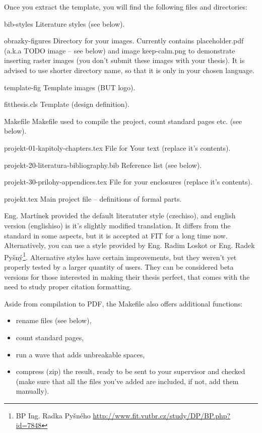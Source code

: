 Once you extract the template, you will find the following files and directories:
\begin{DESCRIPTION}
  \item [bib-styles] Literature styles (see below). 
  \item [obrazky-figures] Directory for your images. Currently contains placeholder.pdf (a.k.a TODO image -- see below) and image keep-calm.png to demonstrate inserting raster images (you don't submit these images with your thesis). It is advised to use shorter directory name, so that it is only in your chosen language.
  \item [template-fig] Template images (BUT logo).
  \item [fitthesis.cls] Template (design definition).
  \item [Makefile] Makefile used to compile the project, count standard pages etc. (see below).
  \item [projekt-01-kapitoly-chapters.tex] File for Your text (replace it's contents).
  \item [projekt-20-literatura-bibliography.bib] Reference list (see below).
  \item [projekt-30-prilohy-appendices.tex] File for your enclosures (replace it's contents).
  \item [projekt.tex] Main project file -- definitions of formal parts.
\end{DESCRIPTION}

Eng. Martínek provided the default literatuter style (czechiso), and english version (englishiso) is it's slightly modified translation. It differs from the standard in some aspects, but it is accepted at FIT for a long time now. Alternatively, you can use a style provided by Eng. Radim Loskot or Eng. Radek Pyšný\footnote{BP Ing. Radka Pyšného \url{http://www.fit.vutbr.cz/study/DP/BP.php?id=7848}}. Alternative styles have certain improvements, but they weren't yet properly tested by a larger quantity of users. They can be considered beta versions for those interested in making their thesis perfect, that comes with the need to study proper citation formatting.

Aside from compilation to PDF, the Makefile also offers additional functions:
\begin{itemize}
  \item rename files (see below),
  \item count standard pages,
  \item run a wave that adds unbreakable spaces,
  \item compress (zip) the result, ready to be sent to your supervisor and checked (make sure that all the files you've added are included, if not, add them manually).
\end{itemize}

